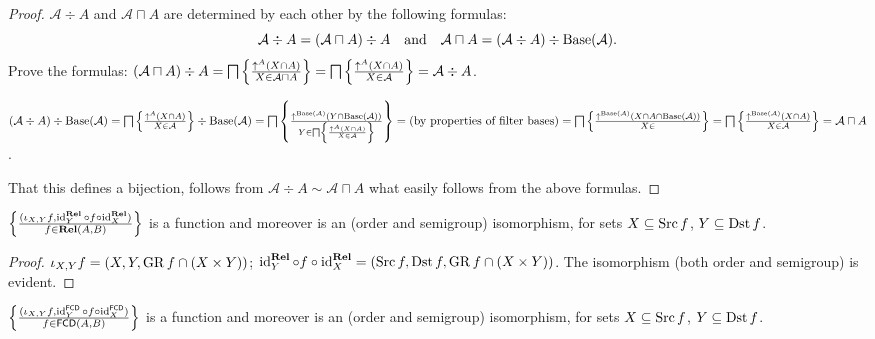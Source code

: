 \begin{proof}
  $\mathcal{A} \div A$ and $\mathcal{A} \sqcap A$ are determined by each other
  by the following formulas:
  \[ \mathcal{A} \div A = (\mathcal{A} \sqcap A) \div A \quad
     \text{and} \quad \mathcal{A} \sqcap A = (\mathcal{A} \div A) \div
     \operatorname{Base} (\mathcal{A}) . \]
  Prove the formulas: $(\mathcal{A} \sqcap A) \div A = \bigsqcap \left\{ \frac{
  \uparrow^A (X \cap A) }{ X \in \mathcal{A} \sqcap A
  }\right\} = \bigsqcap \left\{ \frac{ \uparrow^A (X \cap A) }{
  X \in \mathcal{A} }\right\} = \mathcal{A} \div A$.
  
  $(\mathcal{A} \div A) \div \operatorname{Base} (\mathcal{A}) = \bigsqcap \left\{ \frac{
  \uparrow^A (X \cap A) }{ X \in \mathcal{A} }\right\}
  \div \operatorname{Base} (\mathcal{A}) = \bigsqcap \left\{ \frac{ \uparrow^{\operatorname{Base}
  (\mathcal{A})} (Y \cap \operatorname{Base} (\mathcal{A})) }{
  Y \in \bigsqcap \left\{ \frac{ \uparrow^A (X \cap A) }{
  X \in \mathcal{A} }\right\} }\right\} = \text{(by properties of
  filter bases)} = \bigsqcap \left\{ \frac{ \uparrow^{\operatorname{Base} (\mathcal{A})} (X
  \cap A \cap \operatorname{Base} (\mathcal{A})) }{ X \in
  }\right\} = \bigsqcap \left\{ \frac{ \uparrow^{\operatorname{Base}
  (\mathcal{A})} (X \cap A) }{ X \in \mathcal{A}
  }\right\} = \mathcal{A} \sqcap A$.
  
  That this defines a bijection, follows from $\mathcal{A} \div A \sim
  \mathcal{A} \sqcap A$ what easily follows from the above formulas.
\end{proof}

\begin{prop}
  $\left\{ \frac{ (\iota_{X, Y} f , \operatorname{id}^{\mathbf{Rel}}_Y \circ f \circ
  \operatorname{id}^{\mathbf{Rel}}_X) }{ f \in
  \mathbf{Rel} (A , B) }\right\}$ is a function and moreover is an
  (order and semigroup) isomorphism, for sets $X \subseteq \operatorname{Src} f$, $Y
  \subseteq \operatorname{Dst} f$.
\end{prop}

\begin{proof}
  $\iota_{X, Y} f = (X , Y , \operatorname{GR} f \cap (X \times Y))$;
  $\operatorname{id}^{\mathbf{Rel}}_Y \circ f \circ
  \operatorname{id}^{\mathbf{Rel}}_X = (\operatorname{Src} f , \operatorname{Dst} f ,
  \operatorname{GR} f \cap (X \times Y))$. The isomorphism (both order and semigroup)
  is evident.
\end{proof}

\begin{prop}
  $\left\{ \frac{ (\iota_{X, Y} f , \operatorname{id}^{\mathsf{FCD}}_Y
  \circ f \circ \operatorname{id}^{\mathsf{FCD}}_X) }{
  f \in \mathsf{FCD} (A , B) }\right\}$ is a function and moreover is an
  (order and semigroup) isomorphism, for sets $X \subseteq \operatorname{Src} f$, $Y
  \subseteq \operatorname{Dst} f$.
\end{prop}

